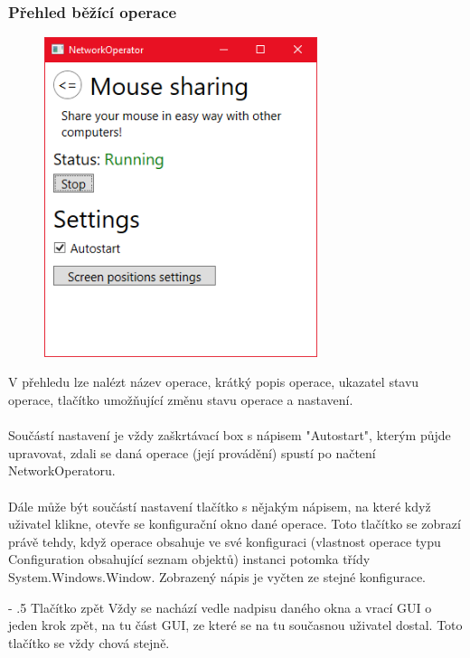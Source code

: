 \documentclass[12pt]{article}
\makeatletter
\renewcommand\paragraph{%
    \@startsection{paragraph}{4}{0mm}%
       {-\baselineskip}%
       {.5\baselineskip}%
       {\normalfont\normalsize\bfseries}}
\makeatother
\begin{document}
\subsubsection{Přehled běžící operace}
\begin{figure}[H]
\includegraphics[width=8cm]{running-operation-overview.png}
\centering
\end{figure}

V přehledu lze nalézt název operace, krátký popis operace, ukazatel stavu operace, tlačítko umožňující změnu stavu operace a nastavení.\\\\
Součástí nastavení je vždy zaškrtávací box s nápisem "Autostart", kterým půjde upravovat, zdali se daná operace (její provádění) spustí po načtení NetworkOperatoru.\\\\
Dále může být součástí nastavení tlačítko s nějakým nápisem, na které když uživatel klikne, otevře se konfigurační okno dané operace. Toto tlačítko se zobrazí právě tehdy, když operace obsahuje ve své konfiguraci (vlastnost operace typu Configuration obsahující seznam objektů) instanci potomka třídy System.Windows.Window. Zobrazený nápis je vyčten ze stejné konfigurace.

\paragraph{Tlačítko zpět}
Vždy se nachází vedle nadpisu daného okna a vrací GUI o jeden krok zpět, na tu část GUI, ze které se na tu současnou uživatel dostal. Toto tlačítko se vždy chová stejně.
\end{document}
